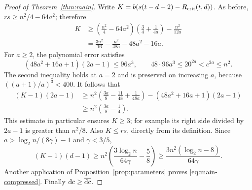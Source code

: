 \begin{proof}[Proof of Theorem~\ref{thm:main}]
Write $K=b(s(t-d+2)-R_{\rm crit}(t,d))$. As before,
$rs\ge n^2/4-64a^2$; therefore
\begin{align*}
 K&\ge\left(\frac{n^2}{4}-64a^2\right)
              \left(\frac34+\frac{1}{4a}\right)-\frac{n^2}{12a}\\
  &=\frac{3n^2}{16}-\frac{n^2}{48a}-48a^2-16a.
\end{align*}
For $a\ge2$, the polynomial error satisfies
\[
 (48a^2+16a+1)(2a-1)\le96a^3,\qquad
 48\cdot96a^3\le20^{2a}<c^{2a}\le n^2.
\]
The second inequality holds at $a=2$ and is preserved on increasing
$a$, because $((a+1)/a)^3<400$. It follows that
\begin{align*}
 (K-1)(2a-1)
 &\ge n^2\left(\frac{3a}{8}-\frac{11}{48}
                         +\frac{1}{48a}\right)
      -(48a^2+16a+1)(2a-1)\\
 &\ge n^2\left(\frac{3a}{8}-\frac14\right).
\end{align*}
This estimate in particular ensures $K\ge3$; for example its
right side divided by $2a-1$ is greater than $n^2/8$.
Also $K\le rs$, directly from its definition.
Since $a>\log_2 n/(8\gamma)-1$ and $\gamma<3/5$,
\[
 (K-1)(d-1)
 \ge n^2\left(\frac{3\log_2 n}{64\gamma}-\frac58\right)
 \ge\frac{3n^2(\log_2 n-8)}{64\gamma}.
\]
Another application of Proposition~\ref{prop:parameters} proves
\eqref{eq:main-compressed}. Finally $\operatorname{dc}\ge\overline{\operatorname{dc}}$.
\end{proof}
